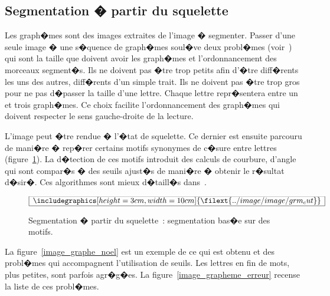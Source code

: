 \subsection{Segmentation � partir du squelette}
\label{image_sequence_graphem}



Les graph�mes sont des images extraites de l'image � segmenter. Passer d'une seule image � une s�quence de graph�mes soul�ve deux probl�mes (voir~) qui sont la taille que doivent avoir les graph�mes et l'ordonnancement des morceaux segment�s. Ils ne doivent pas �tre trop petits afin d'�tre diff�rents les uns des autres, diff�rents d'un simple trait. Ils ne doivent pas �tre trop gros pour ne pas d�passer la taille d'une lettre. Chaque lettre repr�sentera entre un et trois graph�mes. Ce choix facilite l'ordonnancement des graph�mes qui doivent respecter le sens gauche-droite de la lecture. 


L'image peut �tre rendue � l'�tat de squelette. Ce dernier est ensuite parcouru de mani�re � rep�rer certains motifs synonymes de c�sure entre lettres (figure~\ref{image_graphe_cut}). La d�tection de ces motifs introduit des calculs de courbure, d'angle qui sont compar�s � des seuils ajust�s de mani�re � obtenir le r�sultat d�sir�. Ces algorithmes sont mieux d�taill�s dans~.

            \begin{figure}[ht]
        $$\frame{$\begin{array}[c]{c}\includegraphics[height=3cm, width=10cm]
        {\filext{../image/image/grm_cut}}\end{array}$}$$
        \caption{Segmentation � partir du squelette~: segmentation bas�e sur des motifs.}
        \label{image_graphe_cut}
            \end{figure}

La figure~\ref{image_graphe_noel} est un exemple de ce qui est obtenu et des probl�mes qui accompagnent l'utilisation de seuils. Les lettres en fin de mots, plus petites, sont parfois agr�g�es. La figure~\ref{image_grapheme_erreur} recense la liste de ces probl�mes.

